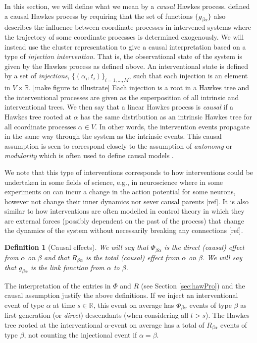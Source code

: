 \documentclass[accepted]{uai2021} %
\newtheorem{defn}[thm]{Definition}
\begin{document}
In this section, we will define what we mean by a {\it causal} Hawkes process. 
\cite{mogensenUAI2020} defined a causal Hawkes process by requiring that the 
set 
of functions $\{g_{\beta\alpha}\}$ also describes the influence between 
coordinate processes in intervened systems where the trajectory of some 
coordinate processes is determined exogenously. We will instead use the cluster 
representation to give a causal
interpretation based on a type of \emph{injection intervention}. That is, the 
observational state of the system is given by the Hawkes process as defined 
above. An interventional state is defined by a set of \emph{injections}, 
$\{(\alpha_i, t_i) \}_{i =1,\ldots, M} $, such that each injection is an 
element in $V\times \mathbb{R}$. [make figure to illustrate] Each injection is 
a root in a Hawkes tree and the interventional processes are given as the 
superposition of all intrinsic and interventional trees. We then say that a 
linear Hawkes process is {\it 
causal} if a Hawkes tree rooted at $\alpha$ has the same distribution as an 
intrinsic Hawkes tree for all coordinate processes $\alpha \in V$. In 
other words, the intervention events 
propagate in the same way through the system as the intrinsic events. This 
causal assumption is seen to correspond closely to 
the assumption of \emph{autonomy} or \emph{modularity} which is often used to 
define causal models 
\citep{pearl2009, petersElements2017}.

We note that this type of interventions corresponds to how interventions could 
be undertaken in some fields of 
science, e.g., in neuroscience where in some experiments on can incur a change 
in the 
action potential for some neurons, however not change their inner dynamics nor 
sever causal parents [ref]. It is also similar to how interventions are often 
modelled in control theory in which they are external forces (possibly 
dependent on the past of the process) that change the dynamics of the system 
without necessarily breaking any connections [ref].

\begin{defn}[Causal effects]
	We will say that $\Phi_{\beta\alpha}$ is the \emph{direct (causal) effect} 
	from 
	$\alpha$ on $\beta$ and that $R_{\beta\alpha}$ is the \emph{total (causal) 
	effect} from $\alpha$ on $\beta$. We will say that $g_{\beta\alpha}$ is the 
	{\it link function} from $\alpha$ to $\beta$.
	\label{def:cauEff}
\end{defn}

The interpretation of the entries in $\Phi$ and $R$ (see Section 
\ref{sec:hawPro}) and the causal assumption justify the above definitions. If 
we inject an 
interventional event of type $\alpha$ at time $s \in \mathbb{R}$, this 
event on average has $\Phi_{\beta\alpha}$ events 
of type $\beta$ as first-generation (or \emph{direct}) descendants (when 
considering all $t > s$). The Hawkes tree rooted at the 
interventional $\alpha$-event on average has a total of $R_{\beta\alpha}$ 
events of 
type $\beta$, not counting the injectional event if $\alpha=\beta$. 
\end{document}
